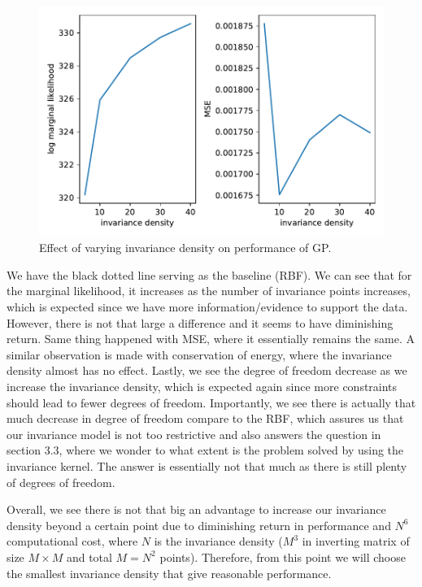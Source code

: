 \documentclass{statsmsc}
\begin{document}
\begin{figure}[H] 
  \includegraphics[width=0.8\linewidth]{../codes/figures/vary_invariance.pdf}
  \centering
  \caption{Effect of varying invariance density on performance of GP.}
  \label{fig:vary_invariance_density}
\end{figure}

We have the black dotted line serving as the baseline (RBF).
We can see that for the marginal likelihood, it increases as the number of invariance points increases, which is expected since we have more information/evidence to support the data.
However, there is not that large a difference and it seems to have diminishing return.
Same thing happened with MSE, where it essentially remains the same.
A similar observation is made with conservation of energy, where the invariance density almost has no effect. 
Lastly, we see the degree of freedom decrease as we increase the invariance density, which is expected again since more constraints should lead to fewer degrees of freedom.
Importantly, we see there is actually that much decrease in degree of freedom compare to the RBF, which assures us that our invariance model is not too restrictive and also answers the question in section 3.3, where we wonder to what extent is the problem solved by using the invariance kernel.
The answer is essentially not that much as there is still plenty of degrees of freedom.

Overall, we see there is not that big an advantage to increase our invariance density beyond a certain point due to diminishing return in performance and $N^6$ computational cost, where $N$ is the invariance density ($M^3$ in inverting matrix of size $M\times M$ and total $M=N^2$ points).
Therefore, from this point we will choose the smallest invariance density that give reasonable performance.  
\end{document}
